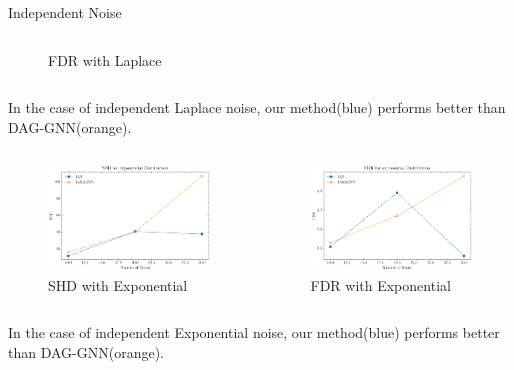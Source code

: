 \documentclass{beamer}
\begin{document}
\begin{frame}[allowframebreaks]{Independent Noise}
\begin{columns}
\begin{column}{0.5\textwidth}
\begin{figure}
                \caption{FDR with Laplace}
                \label{fig:ind_laplace_fdr}
            \end{figure}
        \end{column}
    \end{columns}
    In the case of independent Laplace noise, our method(blue) performs better than DAG-GNN(orange).
    \begin{columns}
        \begin{column}{0.5\textwidth}
            \begin{figure}
                \centering
                \includegraphics[width=\textwidth]{fig/SHD_independence_exponential.pdf}
                \caption{SHD with Exponential}
                \label{fig:ind_exponential_shd}
            \end{figure}
        \end{column}
        \begin{column}{0.5\textwidth}
            \begin{figure}
                \centering
                \includegraphics[width=\textwidth]{fig/FDR_independence_exponential.pdf}
                \caption{FDR with Exponential}
                \label{fig:ind_exponential_fdr}
            \end{figure}
        \end{column}
    \end{columns}
    In the case of independent Exponential noise, our method(blue) performs better than DAG-GNN(orange).


\end{frame}
\end{document}
